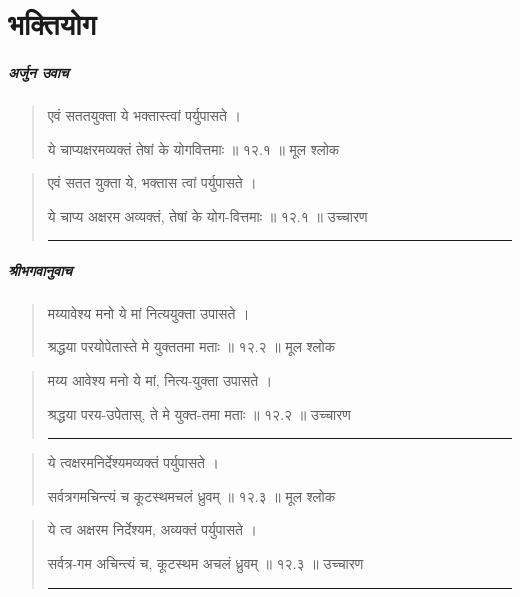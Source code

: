 \chapter{\sanskrit भक्तियोग} 
\paragraph{\sanskrit अर्जुन उवाच}
\begin{quotation} 
एवं सततयुक्ता ये भक्तास्त्वां पर्युपासते  ।  

ये चाप्यक्षरमव्यक्तं तेषां के योगवित्तमाः  ॥ १२.१ ॥  मूल श्लोक
\end{quotation}

\begin{quotation}

एवं सतत युक्ता ये, भक्तास त्वां पर्युपासते  ।  

ये चाप्य अक्षरम अव्यक्तं, तेषां के योग-वित्तमाः  ॥ १२.१ ॥  उच्चारण

\noindent\rule{16cm}{0.4pt} 
\end{quotation}



\paragraph{\sanskrit श्रीभगवानुवाच}
\begin{quotation} 
मय्यावेश्य मनो ये मां नित्ययुक्ता उपासते  ।  

श्रद्धया परयोपेतास्ते मे युक्ततमा मताः  ॥ १२.२ ॥  मूल श्लोक
\end{quotation}

\begin{quotation}

मय्य आवेश्य मनो ये मां, नित्य-युक्ता उपासते  ।  

श्रद्धया परय-उपेतास्, ते मे युक्त-तमा मताः  ॥ १२.२ ॥  उच्चारण

\noindent\rule{16cm}{0.4pt} 
\end{quotation}


\begin{quotation} 

ये त्वक्षरमनिर्देश्यमव्यक्तं पर्युपासते ।  

सर्वत्रगमचिन्त्यं च कूटस्थमचलं ध्रुवम्‌  ॥ १२.३ ॥  मूल श्लोक
\end{quotation}

\begin{quotation}

ये त्व अक्षरम निर्देश्यम, अव्यक्तं पर्युपासते ।  

सर्वत्र-गम अचिन्त्यं च, कूटस्थम अचलं ध्रुवम्‌  ॥ १२.३ ॥  उच्चारण

\noindent\rule{16cm}{0.4pt} 
\end{quotation}


